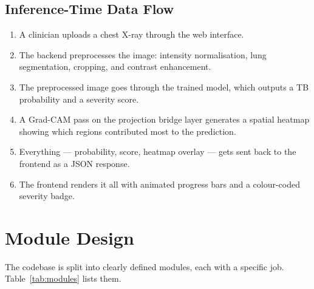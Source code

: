 \documentclass[12pt]{report}
\begin{document}
\subsection{Inference-Time Data Flow}
\begin{enumerate}
    \item A clinician uploads a chest X-ray through the web interface.
    \item The backend preprocesses the image: intensity normalisation, lung segmentation, cropping, and contrast enhancement.
    \item The preprocessed image goes through the trained model, which outputs a TB probability and a severity score.
    \item A Grad-CAM pass on the projection bridge layer generates a spatial heatmap showing which regions contributed most to the prediction.
    \item Everything --- probability, score, heatmap overlay --- gets sent back to the frontend as a JSON response.
    \item The frontend renders it all with animated progress bars and a colour-coded severity badge.
\end{enumerate}

\section{Module Design}

The codebase is split into clearly defined modules, each with a specific job. Table~\ref{tab:modules} lists them.
\end{document}

